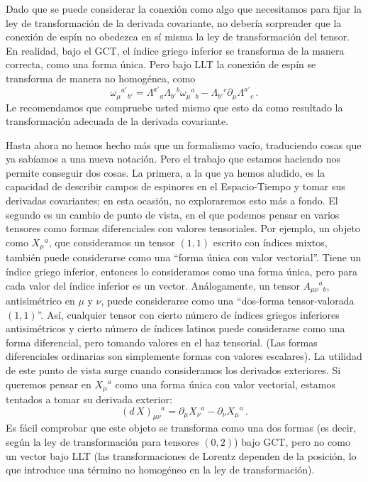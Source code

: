 \documentclass[11pt,b5paper,openany,twoside]{book}
\newcommand{\mn}{{\mu\nu}}
\newcommand{\p}[1]{{\partial_{#1}}}
\begin{document}
Dado que se puede considerar la conexión como algo que necesitamos para fijar la ley de transformación de la derivada covariante, no debería sorprender que la conexión de espín no obedezca en sí misma la ley de transformación del tensor.
En realidad, bajo el GCT, el índice griego inferior se transforma de la manera correcta, como una forma única.
Pero bajo LLT la conexión de espín se transforma de manera no homogénea, como
\begin{equation}
\omega_\mu{}^{a'}{}_{b'} = \Lambda^{a'}{}_a\Lambda_{b'}{}^b
\omega_\mu{}^a{}_b - \Lambda_{b'}{}^c\p\mu\Lambda^{a'}{}_c
\,.\label{3.134}
\end{equation}
Le recomendamos que compruebe usted mismo que esto da como resultado la transformación adecuada de la derivada covariante.

Hasta ahora no hemos hecho más que un formalismo vacío, traduciendo cosas que ya sabíamos a una nueva notación.
Pero el trabajo que estamos haciendo nos permite conseguir dos cosas.
La primera, a la que ya hemos aludido, es la capacidad de describir campos de espinores en el Espacio-Tiempo y tomar sus derivadas covariantes; en esta ocasión, no exploraremos esto más a fondo.
El segundo es un cambio de punto de vista, en el que podemos pensar en varios tensores como formas diferenciales con valores tensoriales.
Por ejemplo, un objeto como $X_\mu{}^a$, que consideramos un tensor $(1,1)$ escrito con índices mixtos, también puede considerarse como una ``forma única con valor vectorial''. Tiene un índice griego inferior, entonces lo consideramos como una forma única, pero para cada valor del índice inferior es un vector.
Análogamente, un tensor $A_{\mu\nu}{}^{a}{}_b$, antisimétrico en $\mu$ y $\nu$, puede considerarse como una ``dos-forma tensor-valorada $(1,1)$''. Así, cualquier tensor con cierto número de índices griegos inferiores antisimétricos y cierto número de índices latinos puede considerarse como una forma diferencial, pero tomando valores en el haz tensorial.
(Las formas diferenciales ordinarias son simplemente formas con valores escalares).
La utilidad de este punto de vista surge cuando consideramos los derivados exteriores.
Si queremos pensar en $X_\mu{}^a$ como una forma única con valor vectorial, estamos tentados a tomar su derivada exterior:
\begin{equation}
( d\,X)_{\mn}{}^a = \p\mu X_\nu{}^a - \p\nu X_\mu{}^a\,.\label{3.135}
\end{equation}
Es fácil comprobar que este objeto se transforma como una dos formas (es decir, según la ley de transformación para tensores $(0,2)$) bajo GCT, pero no como un vector bajo LLT (las transformaciones de Lorentz dependen de la posición, lo que introduce una término no homogéneo en la ley de transformación).
\end{document}
